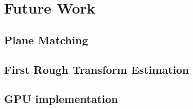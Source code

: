
\chapter{Future Work}

\section{Plane Matching}

\section{First Rough Transform Estimation}

\section{GPU implementation}
